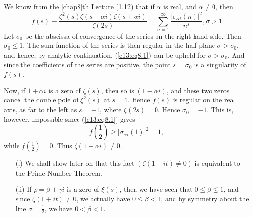 \medskip
{}
\cite[p.89]{key11} 
We know from the \ref{chap8}th Lecture (1.12) that if $\alpha$ is real, and
$\alpha \neq 0$, then 
\begin{equation*}
f(s) \equiv \frac{\zeta^2 (s) \zeta(s-\alpha i) \zeta(s+\alpha
  i)}{\zeta(2s)} = \sum\limits^\infty_{n=1} \frac{|\sigma_{\alpha
    i}(n)|^2}{n^s}, \sigma >1 \tag{8.1}\label{c13:eq8.1}
\end{equation*}
Let $\sigma_0$ be the abscissa of convergence of the series on the
right hand side. Then $\sigma_0 \leq 1$. The sum-function of the
series is then regular in the half-plane $\sigma > \sigma_0$, and
hence, by analytic continuation, (\ref{c13:eq8.1}) can be upheld for $\sigma >
\sigma_0$. And since the coefficients of the series are positive, the
point $s =\sigma_0$ is a singularity of $f(s)$.

Now, if $1+\alpha i$ is a zero of $\zeta(s)$, then so is $(1-\alpha
i)$, and these two zeros cancel the double pole of $\xi^2 (s)$ at
$s=1$. Hence $f(s)$ is regular on the real axis, as far to the left as
$s=-1$, where $\zeta(2s) =0$. Hence $\sigma_0=-1$. This is, however,
impossible since (\ref{c13:eq8.1}) gives
$$
f \left(\frac{1}{2} \right) \geq \left| \sigma_{\alpha i} (1)\right|^2 = 1,
$$
while $f(\frac{1}{2}) =0$. Thus $\zeta(1+\alpha i) \neq 0$.

\begin{remarks*}
\begin{itemize}
\item[(i)] We shall show later on that this fact $(\zeta (1+it) \neq
  0)$ is equivalent to the Prime Number Theorem. 

\item[(ii)] If $\rho = \beta + \gamma i$ is a zero of $\xi (s)$, then
  we have seen that $0 \leq \beta \leq 1$, and since $\zeta (1+it)
  \neq 0$, we actually have $0 \leq \beta <1$, and by symmetry about
  the line $\sigma = \frac{1}{2}$, we have $0< \beta < 1$. 
\end{itemize}
\end{remarks*}
